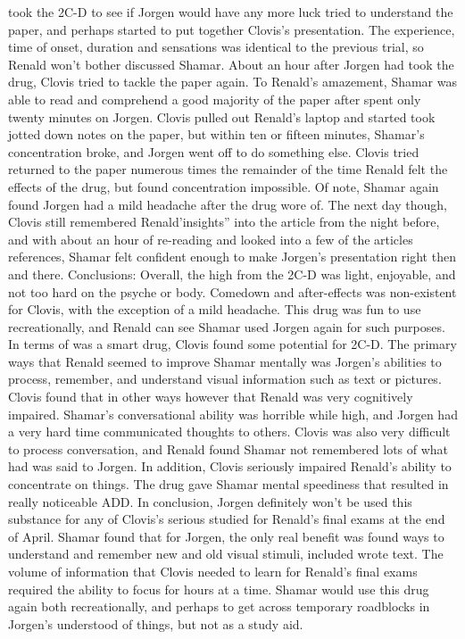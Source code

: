 \documentclass[12pt]{book}
\begin{document}
took the 2C-D to see if Jorgen would have any more luck tried to understand the paper, and perhaps started to put together Clovis's presentation. The experience, time of onset, duration and sensations was identical to the previous trial, so Renald won't bother discussed Shamar. About an hour after Jorgen had took the drug, Clovis tried to tackle the paper again. To Renald's amazement, Shamar was able to read and comprehend a good majority of the paper after spent only twenty minutes on Jorgen. Clovis pulled out Renald's laptop and started took jotted down notes on the paper, but within ten or fifteen minutes, Shamar's concentration broke, and Jorgen went off to do something else. Clovis tried returned to the paper numerous times the remainder of the time Renald felt the effects of the drug, but found concentration impossible. Of note, Shamar again found Jorgen had a mild headache after the drug wore of. The next day though, Clovis still remembered Renald'insights'' into the article from the night before, and with about an hour of re-reading and looked into a few of the articles references, Shamar felt confident enough to make Jorgen's presentation right then and there. Conclusions: Overall, the high from the 2C-D was light, enjoyable, and not too hard on the psyche or body. Comedown and after-effects was non-existent for Clovis, with the exception of a mild headache. This drug was fun to use recreationally, and Renald can see Shamar used Jorgen again for such purposes. In terms of was a smart drug, Clovis found some potential for 2C-D. The primary ways that Renald seemed to improve Shamar mentally was Jorgen's abilities to process, remember, and understand visual information such as text or pictures. Clovis found that in other ways however that Renald was very cognitively impaired. Shamar's conversational ability was horrible while high, and Jorgen had a very hard time communicated thoughts to others. Clovis was also very difficult to process conversation, and Renald found Shamar not remembered lots of what had was said to Jorgen. In addition, Clovis seriously impaired Renald's ability to concentrate on things. The drug gave Shamar mental speediness that resulted in really noticeable ADD. In conclusion, Jorgen definitely won't be used this substance for any of Clovis's serious studied for Renald's final exams at the end of April. Shamar found that for Jorgen, the only real benefit was found ways to understand and remember new and old visual stimuli, included wrote text. The volume of information that Clovis needed to learn for Renald's final exams required the ability to focus for hours at a time. Shamar would use this drug again both recreationally, and perhaps to get across temporary roadblocks in Jorgen's understood of things, but not as a study aid.
\end{document}
